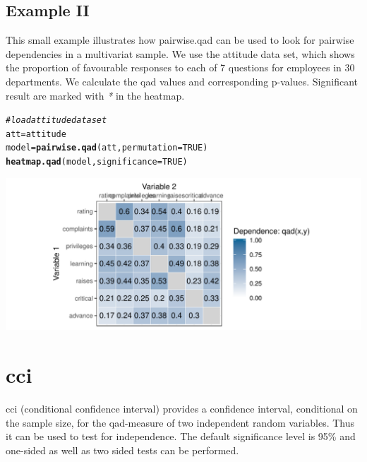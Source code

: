 \documentclass{scrartcl}\usepackage[]{graphicx}\usepackage[]{color}
\makeatletter
\def\maxwidth{ %
  \ifdim\Gin@nat@width>\linewidth
    \linewidth
  \else
    \Gin@nat@width
  \fi
}
\newcommand{\hlnum}[1]{\textcolor[rgb]{0.686,0.059,0.569}{#1}}%
\newcommand{\hlcom}[1]{\textcolor[rgb]{0.678,0.584,0.686}{\textit{#1}}}%
\newcommand{\hlstd}[1]{\textcolor[rgb]{0.345,0.345,0.345}{#1}}%
\newcommand{\hlkwb}[1]{\textcolor[rgb]{0.69,0.353,0.396}{#1}}%
\newcommand{\hlkwc}[1]{\textcolor[rgb]{0.333,0.667,0.333}{#1}}%
\newcommand{\hlkwd}[1]{\textcolor[rgb]{0.737,0.353,0.396}{\textbf{#1}}}%
\newenvironment{kframe}{%
 \def\at@end@of@kframe{}%
 \ifinner\ifhmode%
  \def\at@end@of@kframe{\end{minipage}}%
  \begin{minipage}{\columnwidth}%
 \fi\fi%
 \def\FrameCommand##1{\hskip\@totalleftmargin \hskip-\fboxsep
 \colorbox{shadecolor}{##1}\hskip-\fboxsep
     \hskip-\linewidth \hskip-\@totalleftmargin \hskip\columnwidth}%
 \MakeFramed {\advance\hsize-\width
   \@totalleftmargin\z@ \linewidth\hsize
   \@setminipage}}%
 {\par\unskip\endMakeFramed%
 \at@end@of@kframe}
\newenvironment{knitrout}{}{} %
\makeatother
\begin{document}
\subsection{Example II}
This small example illustrates how pairwise.qad can be used to look for pairwise dependencies in a multivariat sample. We use the attitude data set, which shows the proportion of favourable responses to each of 7 questions for employees in 30 departments. We calculate the qad values and corresponding p-values. Significant result are marked with \textit{*} in the heatmap.
\begin{knitrout}
\color{fgcolor}\begin{kframe}
\begin{alltt}
  \hlcom{#load attitude dataset}
  \hlstd{att} \hlkwb{=} \hlstd{attitude}
  \hlstd{model} \hlkwb{=} \hlkwd{pairwise.qad}\hlstd{(att,} \hlkwc{permutation} \hlstd{=} \hlnum{TRUE}\hlstd{)}
  \hlkwd{heatmap.qad}\hlstd{(model,} \hlkwc{significance} \hlstd{=} \hlnum{TRUE}\hlstd{)}
\end{alltt}
\end{kframe}
\end{knitrout}



\begin{knitrout}
\color{fgcolor}
\includegraphics[width=\maxwidth]{figure/unnamed-chunk-5-1} 

\end{knitrout}

\section{cci}

cci (conditional confidence interval) provides a confidence interval, conditional on the sample size, for the qad-measure of two independent random variables. Thus it can be used to test for independence. The default significance level is 95\% and one-sided as well as two sided tests can be performed.
\end{document}
